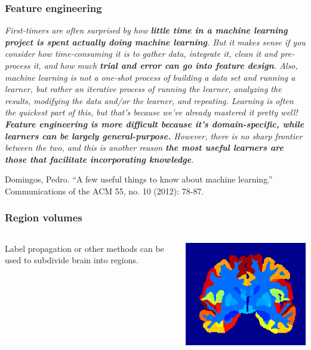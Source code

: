 \begin{frame}
\frametitle{Feature engineering}
\emph{First-timers are often surprised by how {\bf little time in a machine learning project is spent actually doing machine learning}.
But it makes sense if you consider how time-consuming it is to gather data, integrate it, clean it and pre-process it, and how much {\bf trial and error can go into feature design}.
Also, machine learning is not a one-shot process of building a data set and running a learner, but rather an iterative process of running the learner, analyzing the results, modifying the data and/or the learner, and repeating.
Learning is often the quickest part of this, but that's because we've already mastered it pretty well!
{\bf Feature engineering is more difficult because it's domain-specific, while learners can be largely general-purpose.}
However, there is no sharp frontier between the two, and this is another reason {\bf the most useful learners are those that facilitate incorporating knowledge}.
}

\vspace{1cm}
\begin{tiny}
Domingos, Pedro. ``A few useful things to know about machine learning.'' Communications of the ACM 55, no. 10 (2012): 78-87.\par
\end{tiny}
\end{frame}

\begin{frame}
\frametitle{Region volumes}
\begin{columns}[c]
Label propagation or other methods can be used to subdivide brain into regions.\par

\includegraphics[width=\textwidth]{brain-regions}
\end{columns}
\end{frame}

